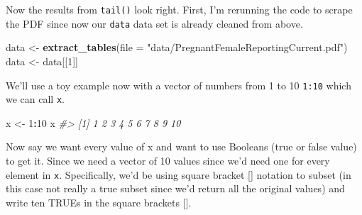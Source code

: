 \documentclass[
  12pt,
]{book}
\newenvironment{Shaded}{\begin{snugshade}}{\end{snugshade}}
\newcommand{\CommentTok}[1]{\textcolor[rgb]{0.37,0.37,0.37}{\textit{#1}}}
\newcommand{\DataTypeTok}[1]{\textcolor[rgb]{0.27,0.27,0.27}{#1}}
\newcommand{\DecValTok}[1]{\textcolor[rgb]{0.06,0.06,0.06}{#1}}
\newcommand{\KeywordTok}[1]{\textcolor[rgb]{0.27,0.27,0.27}{\textbf{#1}}}
\newcommand{\NormalTok}[1]{#1}
\newcommand{\OperatorTok}[1]{\textcolor[rgb]{0.43,0.43,0.43}{\textbf{#1}}}
\newcommand{\StringTok}[1]{\textcolor[rgb]{0.5,0.5,0.5}{#1}}
\begin{document}
\begin{Shaded}
\end{Shaded}

Now the results from \texttt{tail()} look right. First, I'm rerunning the code to scrape the PDF since now our \texttt{data} data set is already cleaned from above.

\begin{Shaded}
\begin{Highlighting}[]
\NormalTok{data <{-}}\StringTok{ }\KeywordTok{extract\_tables}\NormalTok{(}\DataTypeTok{file =} \StringTok{"data/PregnantFemaleReportingCurrent.pdf"}\NormalTok{)}
\NormalTok{data <{-}}\StringTok{ }\NormalTok{data[[}\DecValTok{1}\NormalTok{]]}
\end{Highlighting}
\end{Shaded}

We'll use a toy example now with a vector of numbers from 1 to 10 \texttt{1:10} which we can call \texttt{x}.

\begin{Shaded}
\begin{Highlighting}[]
\NormalTok{x <{-}}\StringTok{ }\DecValTok{1}\OperatorTok{:}\DecValTok{10}
\NormalTok{x}
\CommentTok{\#>  [1]  1  2  3  4  5  6  7  8  9 10}
\end{Highlighting}
\end{Shaded}

Now say we want every value of x and want to use Booleans (true or false value) to get it. Since we need a vector of 10 values since we'd need one for every element in \texttt{x}. Specifically, we'd be using square bracket {[}{]} notation to subset (in this case not really a true subset since we'd return all the original values) and write ten TRUEs in the square brackets {[}{]}.
\end{document}
